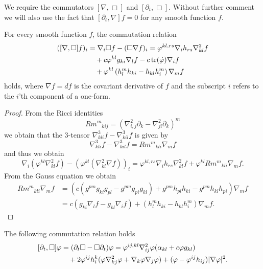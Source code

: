 \documentclass{amsart}
\begin{document}
We require the commutators \([\nabla, \Box]\) and \([\partial_t, \Box]\). Without further comment we will also use the fact that \([\partial_t, \nabla] f = 0\) for any smooth function \(f\).
\begin{lemma}
\label{lem:gradBox}
For every smooth function $f$, the commutation relation
\[
\begin{split}
([\nabla, \Box]f)_i &= \nabla_i \Box f - (\Box \nabla f)_i = \varphi^{kl,rs} \nabla_i h_{rs} \nabla^2_{kl} f \\
&\quad + c \varphi^{kl} g_{ki} \nabla_l f - c \operatorname{tr}(\dot{\varphi}) \nabla_i f \\
&\quad + \varphi^{kl}\left(h^{m}_{l}h_{ki} - h_{kl}h^{m}_{i}\right) \nabla_m f
\end{split}
\]
holds, where \(\nabla f = df\) is the covariant derivative of \(f\) and the subscript \(i\) refers to the \(i\)'th component of a one-form.
\end{lemma}
\begin{proof}
From the Ricci identities
\[
{Rm^m}_{kij}  = \left(\nabla^2_{i, j} \partial_k - \nabla^2_{ji} \partial_k\right)^m
\]
we obtain that the $3$-tensor $\nabla^3_{kli}f-\nabla^3_{kil}f$
is given by
\[
\nabla^3_{kli}f-\nabla^3_{kil}f={Rm^m}_{kli}\nabla_m f
\]
and thus we obtain
\[
\nabla_i (\varphi^{kl} \nabla^2_{kl} f) - (\varphi^{kl}(\nabla^2_{kl} \nabla f))_i = \varphi^{kl,rs} \nabla_i h_{rs} \nabla^2_{kl}f + \varphi^{kl}{Rm^{m}}_{kli} \nabla_m f.
\]
From the Gauss equation we obtain
\[
\begin{split}
{Rm^{m}}_{kli} \nabla_m f &= \left(c\left(g^{pm}g_{ki}g_{pl}  - g^{pm}g_{pi}g_{kl}\right) + g^{pm} h_{pl}h_{ki} - g^{pm}h_{kl}h_{pi}\right) \nabla_m f \\
&= c\left(g_{ki} \nabla_l f - g_{kl} \nabla_i f\right) + \left(h^{m}_{l}h_{ki} - h_{kl}h^{m}_{i}\right) \nabla_m f.
\end{split}
\]
\end{proof}
\begin{lemma}
\label{lem:deltBox}
The following commutation relation holds
\[
\begin{split}
[\partial_t, \Box] \varphi &= (\partial_{t}\Box - \Box\partial_{t}) \varphi = \varphi^{ij,kl} \nabla^2_{ij} \varphi (\alpha_{kl} + c \varphi g_{kl}) \\
&\quad + 2\varphi^{ij}h^{k}_{i} (\varphi \nabla^2_{k
j} \varphi + \nabla_k \varphi \nabla_j \varphi) + (\varphi - \varphi^{ij}h_{ij})| \nabla\varphi|^{2}.
\end{split}
\]
\end{lemma}
\end{document}
